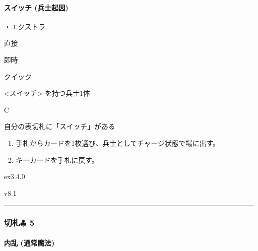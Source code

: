 \documentclass[letterpaper,10pt,dvipdfmx]{sphinxmanual}
\begin{document}
\paragraph{スイッチ (兵士起因)}
\label{\detokenize{auto/frameActionlist:act-switch}}\label{\detokenize{auto/frameActionlist:id70}}
\sphinxAtStartPar
{}

\sphinxAtStartPar
・エクストラ

\sphinxAtStartPar
{} 直接

\sphinxAtStartPar
{} 即時

\sphinxAtStartPar
{} クイック

\sphinxAtStartPar
{} \textless{}スイッチ\textgreater{} を持つ兵士1体

\sphinxAtStartPar
{} C

\sphinxAtStartPar
{}

\sphinxAtStartPar
自分の表切札に「スイッチ」がある

\sphinxAtStartPar
{}
\begin{enumerate}
%
\item {} 
\sphinxAtStartPar
手札からカードを1枚選び、兵士としてチャージ状態で場に出す。

\item {} 
\sphinxAtStartPar
キーカードを手札に戻す。

\end{enumerate}

\sphinxAtStartPar
{}  ex3.4.0

\sphinxAtStartPar
{}  v8.1


\bigskip\hrule\bigskip



\subsubsection{切札{\normalsize $\clubsuit$} 5}
\label{\detokenize{auto/frameActionlist:id71}}

\paragraph{内乱 (通常魔法)}
\label{\detokenize{auto/frameActionlist:act-civilwar}}\label{\detokenize{auto/frameActionlist:id72}}
\sphinxAtStartPar
{}
\end{document}

